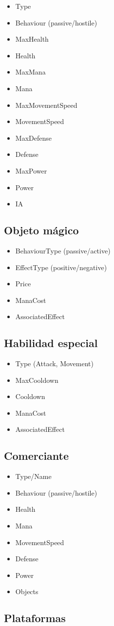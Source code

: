 \begin{itemize}
    \item Type
    \item Behaviour (passive/hostile)
    \item MaxHealth
    \item Health
    \item MaxMana
    \item Mana
    \item MaxMovementSpeed
    \item MovementSpeed
    \item MaxDefense
    \item Defense
    \item MaxPower
    \item Power
    \item IA
\end{itemize}

\subsection{Objeto mágico}
\begin{itemize}
    \item BehaviourType (passive/active)
    \item EffectType (positive/negative)
    \item Price
    \item ManaCost
    \item AssociatedEffect
\end{itemize}

\subsection{Habilidad especial}
\begin{itemize}
    \item Type (Attack, Movement)
    \item MaxCooldown
    \item Cooldown
    \item ManaCost
    \item AssociatedEffect
\end{itemize}

\subsection{Comerciante}
\begin{itemize}
    \item Type/Name
    \item Behaviour (passive/hostile)
    \item Health
    \item Mana
    \item MovementSpeed
    \item Defense
    \item Power
    \item Objects
\end{itemize}

\subsection{Plataformas}
